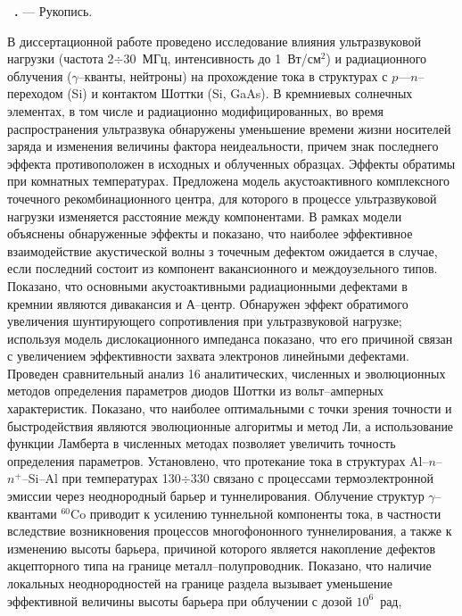 \vspace{-2.5em}

\textbf{\thesisAuthorFIOru~\thesisTitleRu.} --- Рукопись.

\abstractBeginRu

В диссертационной работе проведено исследование влияния ультразвуковой нагрузки (частота 2$\div$30~МГц, интенсивность до 1~Вт/см$^2$) 
и радиационного облучения ($\gamma$--кванты, нейтроны) на прохождение тока в структурах с $p$---$n$--переходом (Si) и контактом Шоттки (Si, GaAs).
В кремниевых солнечных элементах, в том числе и радиационно модифицированных, во время распространения ультразвука обнаружены 
уменьшение времени жизни носителей заряда и изменения величины фактора неидеальности,
причем знак последнего эффекта противоположен в исходных и облученных образцах.
Эффекты обратимы при комнатных температурах.
Предложена модель акустоактивного комплексного точечного рекомбинационного центра, для которого в процессе ультразвуковой нагрузки изменяется расстояние между компонентами.
В рамках модели объяснены обнаруженные эффекты и показано, что наиболее эффективное взаимодействие акустической волны з точечным дефектом ожидается в случае, если последний состоит из компонент вакансионного и междоузельного типов.
Показано, что основными акустоактивными радиационными дефектами в кремнии являются дивакансия и А--центр.
 Обнаружен эффект обратимого увеличения шунтирующего сопротивления при ультразвуковой нагрузке;
используя модель дислокационного импеданса показано, что его причиной связан с увеличением эффективности захвата электронов линейными дефектами.
 Проведен сравнительный анализ 16 аналитических, численных и эволюционных методов определения параметров диодов Шоттки из вольт--амперных характеристик.
 Показано, что наиболее оптимальными с точки зрения точности и быстродействия являются эволюционные алгоритмы и метод Ли,
 а использование функции Ламберта в численных методах позволяет увеличить точность определения параметров.
  Установлено, что протекание тока в структурах Al--$n$--$n^+$--Si--Al при температурах 130$\div$330 связано с процессами термоэлектронной эмиссии через неоднородный барьер и туннелирования.
 Облучение структур $\gamma$--квантами $^{60}$Co приводит к усилению туннельной компоненты тока, в частности вследствие возникновения процессов многофононного туннелирования,
 а также к изменению высоты барьера, причиной которого является накопление дефектов акцепторного типа на границе металл--полупроводник.
 Показано, что наличие  локальных неоднородностей на границе раздела вызывает уменьшение эффективной  величины высоты барьера при облучении с дозой $10^6$~рад,
